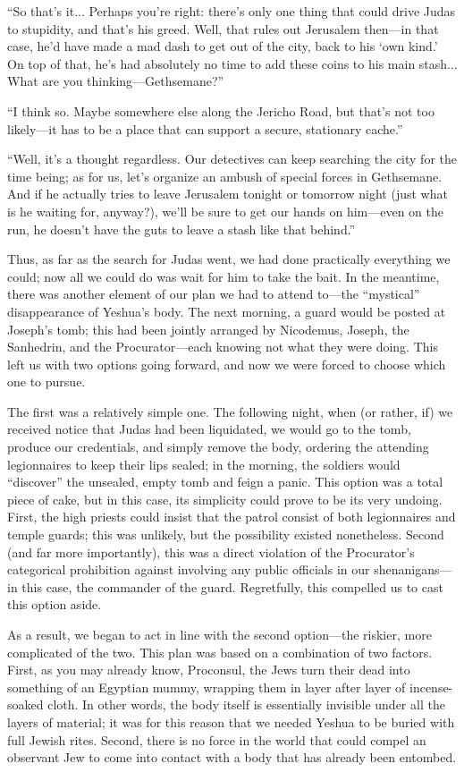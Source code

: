 ``So that's it... Perhaps you're right: there's only one thing that could drive Judas to stupidity, and that's his greed. Well, that rules out Jerusalem then---in that case, he'd have made a mad dash to get out of the city, back to his `own kind.' On top of that, he's had absolutely no time to add these coins to his main stash... What are you thinking---Gethsemane?''

``I think so. Maybe somewhere else along the Jericho Road, but that's not too likely---it has to be a place that can support a secure, stationary cache.''

``Well, it's a thought regardless. Our detectives can keep searching the city for the time being; as for us, let's organize an ambush of special forces in Gethsemane. And if he actually tries to leave Jerusalem tonight or tomorrow night (just what is he waiting for, anyway?), we'll be sure to get our hands on him---even on the run, he doesn't have the guts to leave a stash like that behind.''

Thus, as far as the search for Judas went, we had done practically everything we could; now all we could do was wait for him to take the bait. In the meantime, there was another element of our plan we had to attend to---the ``mystical'' disappearance of Yeshua's body. The next morning, a guard would be posted at Joseph's tomb; this had been jointly arranged by Nicodemus, Joseph, the Sanhedrin, and the Procurator---each knowing not what they were doing. This left us with two options going forward, and now we were forced to choose which one to pursue.

The first was a relatively simple one. The following night, when (or rather, if) we received notice that Judas had been liquidated, we would go to the tomb, produce our credentials, and simply remove the body, ordering the attending legionnaires to keep their lips sealed; in the morning, the soldiers would ``discover'' the unsealed, empty tomb and feign a panic. This option was a total piece of cake, but in this case, its simplicity could prove to be its very undoing. First, the high priests could insist that the patrol consist of both legionnaires and temple guards; this was unlikely, but the possibility existed nonetheless. Second (and far more importantly), this was a direct violation of the Procurator's categorical prohibition against involving any public officials in our shenanigans---in this case, the commander of the guard. Regretfully, this compelled us to cast this option aside.

As a result, we began to act in line with the second option---the riskier, more complicated of the two. This plan was based on a combination of two factors. First, as you may already know, Proconsul, the Jews turn their dead into something of an Egyptian mummy, wrapping them in layer after layer of incense-soaked cloth. In other words, the body itself is essentially invisible under all the layers of material; it was for this reason that we needed Yeshua to be buried with full Jewish rites. Second, there is no force in the world that could compel an observant Jew to come into contact with a body that has already been entombed.

